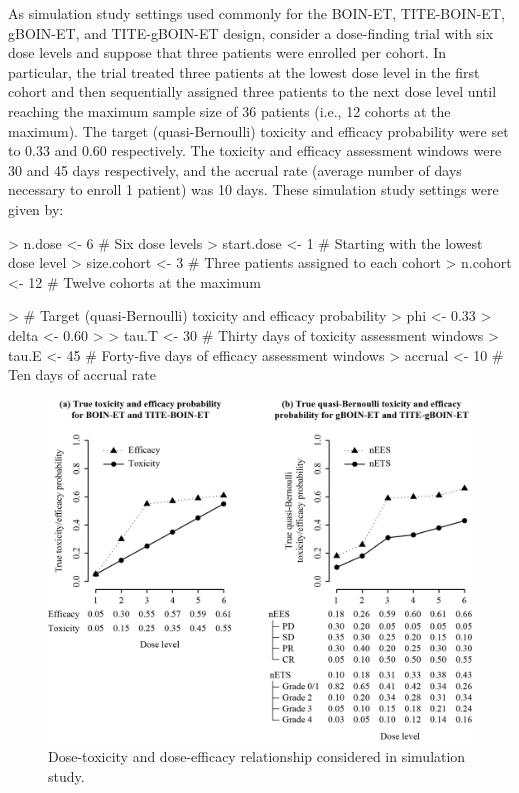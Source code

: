 As simulation study settings used commonly for the BOIN-ET, TITE-BOIN-ET, gBOIN-ET, and TITE-gBOIN-ET design, consider a dose-finding trial with six dose levels and suppose that three patients were enrolled per cohort. In particular, the trial treated three patients at the lowest dose level in the first cohort and then sequentially assigned three patients to the next dose level until reaching the maximum sample size of 36 patients (i.e., 12 cohorts at the maximum). The target (quasi-Bernoulli) toxicity and efficacy probability were set to 0.33 and 0.60 respectively. The toxicity and efficacy assessment windows were 30 and 45 days respectively, and the accrual rate (average number of days necessary to enroll 1 patient) was 10 days. These simulation study settings were given by:

\begin{example}
> n.dose      <- 6   # Six dose levels
> start.dose  <- 1   # Starting with the lowest dose level
> size.cohort <- 3   # Three patients assigned to each cohort
> n.cohort    <- 12  # Twelve cohorts at the maximum

> # Target (quasi-Bernoulli) toxicity and efficacy probability
> phi   <- 0.33
> delta <- 0.60
>
> tau.T   <- 30  # Thirty days of toxicity assessment windows
> tau.E   <- 45  # Forty-five days of efficacy assessment windows
> accrual <- 10  # Ten days of accrual rate
\end{example}

\begin{figure}[!t]
  \centering
  \includegraphics{figure1}
  \caption{Dose-toxicity and dose-efficacy relationship considered in simulation study.}
\end{figure}

